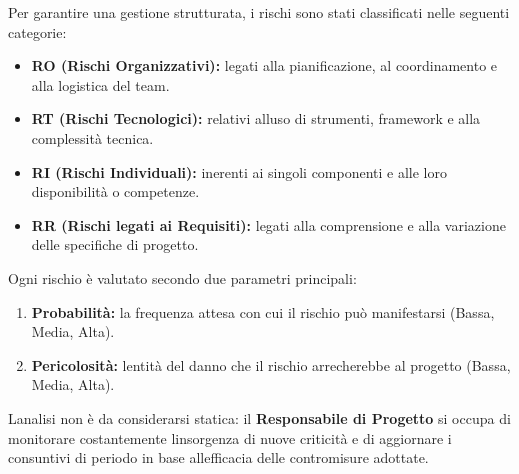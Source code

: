 \documentclass[12pt, a4paper]{article}
\begin{document}
Per garantire una gestione strutturata, i rischi sono stati classificati
nelle seguenti categorie:

\begin{itemize}
\item
  \textbf{RO (Rischi Organizzativi):} legati alla pianificazione, al
  coordinamento e alla logistica del team.
\item
  \textbf{RT (Rischi Tecnologici):} relativi all\textquotesingle uso di
  strumenti, framework e alla complessità tecnica.
\item
  \textbf{RI (Rischi Individuali):} inerenti ai singoli componenti e
  alle loro disponibilità o competenze.
\item
  \textbf{RR (Rischi legati ai Requisiti):} legati alla comprensione e
  alla variazione delle specifiche di progetto.
\end{itemize}

Ogni rischio è valutato secondo due parametri principali:

\begin{enumerate}
\def\labelenumi{\arabic{enumi}.}
\item
  \textbf{Probabilità:} la frequenza attesa con cui il rischio può
  manifestarsi (Bassa, Media, Alta).
\item
  \textbf{Pericolosità:} l\textquotesingle entità del danno che il
  rischio arrecherebbe al progetto (Bassa, Media, Alta).
\end{enumerate}

L\textquotesingle analisi non è da considerarsi statica: il
\textbf{Responsabile di Progetto} si occupa di monitorare costantemente
l\textquotesingle insorgenza di nuove criticità e di aggiornare i
consuntivi di periodo in base all\textquotesingle efficacia delle
contromisure adottate.

\newpage
\end{document}

